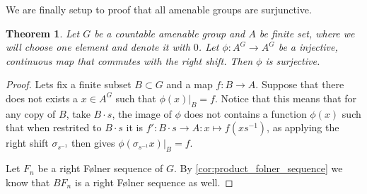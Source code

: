 \documentclass[titlepage, a4paper]{article}
\newtheorem{theorem}{Theorem}[section]
\theoremstyle{remark}
\begin{document}
We are finally setup to proof that all amenable groups are surjunctive.
\begin{theorem}
	Let $G$ be a countable amenable group and  $A$ be finite set, where we will choose one element and denote it with $0$. Let  $\phi: A^{G} \to A^{G}$ be a injective, continuous map that commutes with the right shift. Then $\phi$ is surjective.
\end{theorem}

\begin{proof}
	Lets fix a finite subset $B \subset G$ and a map $f:B\to A$. 
	Suppose that there does not exists a  $x \in A^{G}$ such that $\phi(x)|_B = f$.
	Notice that this means that for any copy of $B$, take  $B\cdot s$, the image of $\phi$ does not contains a function  $\phi(x)$ such that when restrited to  $B\cdot s$ it is $f': B\cdot s \to A: x \mapsto f\left( x s^{-1} \right) $, as applying the right shift $\sigma_{s^{-1}}$ then gives $\phi(\sigma_{s^{-1}} x) |_{B} = f$.

	Let $F_n$ be a right Følner sequence of $G$. By \cref{cor:product_folner_sequence} we know that $BF_n$ is a right Følner sequence as well. 


\end{proof}
\end{document}
